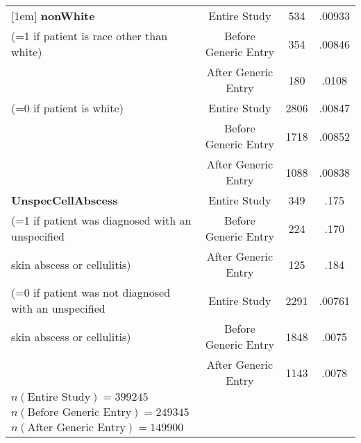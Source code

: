 \begin{table}[htbp]
\begin{tabular}{l*{3}{c}}
[1em]
\textbf{nonWhite}                                       &     Entire Study&             534&      .00933\\
(=1 if patient is race other than white)                &     Before Generic Entry&     354&      .00846\\
                                                        &     After Generic Entry&      180&      .0108\\
[1em]
(=0 if patient is white)                                &     Entire Study&             2806&      .00847\\
                                                        &     Before Generic Entry&     1718&      .00852\\
                                                        &     After Generic Entry&      1088&      .00838\\
[1em]
\textbf{UnspecCellAbscess}                              &     Entire Study&             349 &      .175\\
(=1 if patient was diagnosed with an unspecified        &     Before Generic Entry&     224 &      .170\\
 skin abscess or cellulitis)                            &     After Generic Entry&      125  &      .184\\
[1em]
(=0 if patient was not diagnosed with an unspecified    &     Entire Study&             2291 &      .00761\\
skin abscess or cellulitis)                             &     Before Generic Entry&     1848 &      .0075\\
                                                        &     After Generic Entry&      1143  &      .0078\\
\hline
$n(\text{Entire Study}) = 399245$\\
$n(\text{Before Generic Entry}) = 249345$\\
$n(\text{After Generic Entry}) = 149900$\\
\hline\hline
\end{tabular}
\label{tab:Table4.4}
\end{table}

